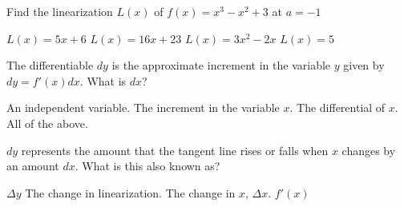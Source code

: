 \documentclass[addpoints, 12pt]{exam}%
\newcommand{\spc}{\vspace*{0.5cm}}
\begin{document}
\begin{questions}
Find the linearization $L(x)$ of $f(x) = x^3 -x^2 + 3$ at $a = -1$

\begin{multicols}{2}
\begin{choices}
\CorrectChoice $L(x) = 5x + 6$
\choice $L(x) = 16x + 23$
\choice $L(x) = 3x^2 - 2x$
\choice $L(x) = 5$
\end{choices}
\end{multicols}

\newpage

\question[1]

The differentiable $dy$ is the approximate increment in the variable $y$ given by $dy = f'(x)dx$. What is $dx$?

\begin{choices}
\choice An independent variable.
\choice The increment in the variable $x$.
\choice The differential of $x$.
\CorrectChoice All of the above.
\end{choices}

\spc

\question[1]

$dy$ represents the amount that the tangent line rises or falls when $x$ changes by an amount $dx$. What is this also known as?

\begin{choices}
\choice $\Delta y$
\CorrectChoice The change in linearization. 
\choice The change in $x$, $\Delta x$.
\choice $f'(x)$
\end{choices}

\end{questions}
\end{document}
